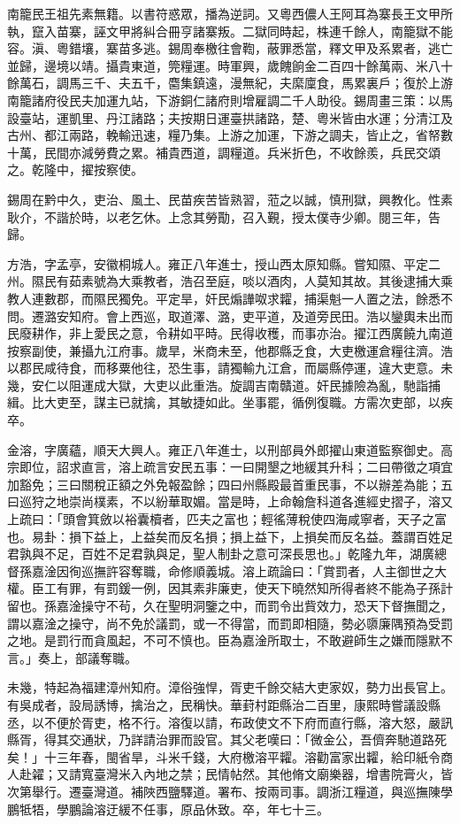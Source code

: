 \begin{pinyinscope}
南籠民王祖先素無籍。以書符惑眾，播為逆詞。又粵西儂人王阿耳為寨長王文甲所執，竄入苗寨，誣文甲將糾合冊亨諸寨叛。二獄同時起，株連千餘人，南籠獄不能容。滇、粵錯壤，寨苗多逃。錫周奉檄往會鞫，蔽罪悉當，釋文甲及系累者，逃亡並歸，邊境以靖。攝貴東道，筦糧運。時軍興，歲餽餉金二百四十餘萬兩、米八十餘萬石，調馬三千、夫五千，麕集鎮遠，漫無紀，夫縻廩食，馬累裏戶；復於上游南籠諸府役民夫加運九站，下游銅仁諸府則增雇調二千人助役。錫周畫三策：以馬設臺站，運凱里、丹江諸路；夫按期日運臺拱諸路，楚、粵米皆由水運；分清江及古州、都江兩路，輓輸迅速，糧乃集。上游之加運，下游之調夫，皆止之，省帑數十萬，民間亦減勞費之累。補貴西道，調糧道。兵米折色，不收餘羨，兵民交頌之。乾隆中，擢按察使。

錫周在黔中久，吏治、風土、民苗疾苦皆熟習，蒞之以誠，慎刑獄，興教化。性素耿介，不諧於時，以老乞休。上念其勞勩，召入覲，授太僕寺少卿。閱三年，告歸。

方浩，字孟亭，安徽桐城人。雍正八年進士，授山西太原知縣。嘗知隰、平定二州。隰民有茹素號為大乘教者，浩召至庭，啖以酒肉，人莫知其故。其後逮捕大乘教人連數郡，而隰民獨免。平定旱，奸民煽譁呶求糶，捕渠魁一人置之法，餘悉不問。遷潞安知府。會上西巡，取道澤、潞，吏平道，及道旁民田。浩以鑾輿未出而民廢耕作，非上愛民之意，令耕如平時。民得收穫，而事亦治。擢江西廣饒九南道按察副使，兼攝九江府事。歲旱，米商未至，他郡縣乏食，大吏檄運倉糧往濟。浩以郡民咸待食，而移粟他往，恐生事，請獨輸九江倉，而屬縣停運，違大吏意。未幾，安仁以阻運成大獄，大吏以此重浩。旋調吉南贛道。奸民據險為亂，馳詣捕緝。比大吏至，謀主已就擒，其敏捷如此。坐事罷，循例復職。方需次吏部，以疾卒。

金溶，字廣蘊，順天大興人。雍正八年進士，以刑部員外郎擢山東道監察御史。高宗即位，詔求直言，溶上疏言安民五事：一曰開墾之地緩其升科；二曰帶徵之項宜加豁免；三曰關稅正額之外免報盈餘；四曰州縣殿最首重民事，不以辦差為能；五曰巡狩之地崇尚樸素，不以紛華取媚。當是時，上命翰詹科道各進經史摺子，溶又上疏曰：「頭會箕斂以裕囊櫝者，匹夫之富也；輕徭薄稅使四海咸寧者，天子之富也。易卦：損下益上，上益矣而反名損；損上益下，上損矣而反名益。蓋謂百姓足君孰與不足，百姓不足君孰與足，聖人制卦之意可深長思也。」乾隆九年，湖廣總督孫嘉淦因徇巡撫許容奪職，命修順義城。溶上疏論曰：「賞罰者，人主御世之大權。臣工有罪，有罰鍰一例，因其素非廉吏，使天下曉然知所得者終不能為子孫計留也。孫嘉淦操守不茍，久在聖明洞鑒之中，而罰令出貲效力，恐天下督撫聞之，謂以嘉淦之操守，尚不免於議罰，或一不得當，而罰即相隨，勢必隳廉隅預為受罰之地。是罰行而貪風起，不可不慎也。臣為嘉淦所取士，不敢避師生之嫌而隱默不言。」奏上，部議奪職。

未幾，特起為福建漳州知府。漳俗強悍，胥吏千餘交結大吏家奴，勢力出長官上。有吳成者，設局誘博，擒治之，民稱快。華葑村距縣治二百里，康熙時嘗議設縣丞，以不便於胥吏，格不行。溶復以請，布政使文不下府而直行縣，溶大怒，嚴訊縣胥，得其交通狀，乃詳請治罪而設官。其父老嘆曰：「微金公，吾儕奔馳道路死矣！」十三年春，閩省旱，斗米千錢，大府檄溶平糶。溶勸富家出糶，給印紙令商人赴糴；又請寬臺灣米入內地之禁；民情帖然。其他脩文廟樂器，增書院膏火，皆次第舉行。遷臺灣道。補陜西鹽驛道。署布、按兩司事。調浙江糧道，與巡撫陳學鵬牴牾，學鵬論溶迂緩不任事，原品休致。卒，年七十三。


\end{pinyinscope}
